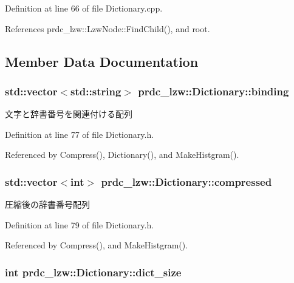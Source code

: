 Definition at line 66 of file Dictionary.\-cpp.



References prdc\-\_\-lzw\-::\-Lzw\-Node\-::\-Find\-Child(), and root.



\subsection{Member Data Documentation}
\hypertarget{classprdc__lzw_1_1Dictionary_af5c7156370b9ee5d0e060624d409bce1}{
\subsubsection[{binding}]{\setlength{\rightskip}{0pt plus 5cm}std\-::vector$<$std\-::string$>$ prdc\-\_\-lzw\-::\-Dictionary\-::binding}}\label{classprdc__lzw_1_1Dictionary_af5c7156370b9ee5d0e060624d409bce1}


文字と辞書番号を関連付ける配列 



Definition at line 77 of file Dictionary.\-h.



Referenced by Compress(), Dictionary(), and Make\-Histgram().

\hypertarget{classprdc__lzw_1_1Dictionary_a18e15168c7acd82f062141627e5a8b75}{
\subsubsection[{compressed}]{\setlength{\rightskip}{0pt plus 5cm}std\-::vector$<$int$>$ prdc\-\_\-lzw\-::\-Dictionary\-::compressed}}\label{classprdc__lzw_1_1Dictionary_a18e15168c7acd82f062141627e5a8b75}


圧縮後の辞書番号配列 



Definition at line 79 of file Dictionary.\-h.



Referenced by Compress(), and Make\-Histgram().

\hypertarget{classprdc__lzw_1_1Dictionary_ac96b4db6d4692ba9b082fe32e54bcf0d}{
\subsubsection[{dict\-\_\-size}]{\setlength{\rightskip}{0pt plus 5cm}int prdc\-\_\-lzw\-::\-Dictionary\-::dict\-\_\-size\hspace{0.3cm}{\ttfamily [private]}}}\label{classprdc__lzw_1_1Dictionary_ac96b4db6d4692ba9b082fe32e54bcf0d}


